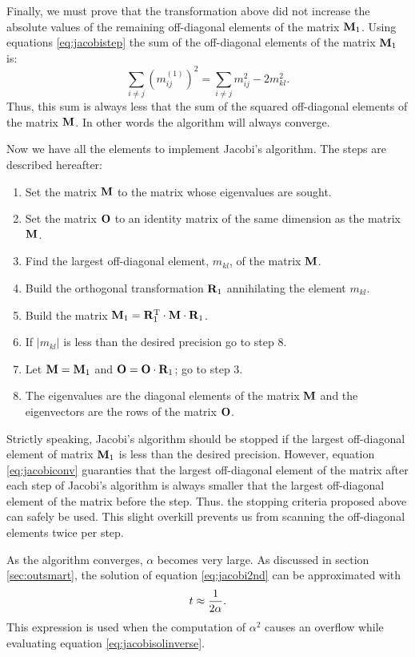 \documentclass[twoside]{book}
\begin{document}
Finally, we must prove that the transformation above did not
increase the absolute values of the remaining off-diagonal
elements of the matrix ${\bf M}_1$. Using equations
\ref{eq:jacobistep} the sum of the off-diagonal elements of the
matrix ${\bf M}_1$ is:
\begin{equation}
\label{eq:jacobiconv}
  \sum_{i\ne j}\left(m^{\left(1\right)}_{ij}\right)^2=\sum_{i\ne j}m_{ij}^2-2 m^2_{kl}.
\end{equation}
Thus, this sum is always less that the sum of the squared
off-diagonal elements of the matrix ${\bf M}$. In other words the
algorithm will always converge.

 Now we have all the elements to
implement Jacobi's algorithm. The steps are described hereafter:
\begin{enumerate}
  \item Set the matrix ${\bf M}$ to the matrix whose eigenvalues
  are sought.
  \item Set the matrix ${\bf O}$ to an identity matrix of the same
  dimension as the matrix ${\bf M}$.
  \item Find the largest off-diagonal element, $m_{kl}$, of the matrix ${\bf
  M}$.
  \item Build the orthogonal transformation ${\bf R}_1$
  annihilating the element $m_{kl}$.
  \item Build the matrix ${\bf M}_1={\bf R}^{\mathop{\rm T}}_1\cdot{\bf M}\cdot{\bf
  R}_1$.
  \item If $\left|m_{kl}\right|$ is less than the desired
  precision go to step 8.
  \item Let ${\bf M}={\bf M}_1$ and ${\bf O}={\bf O}\cdot{\bf R}_1$; go to step 3.
  \item The eigenvalues are the diagonal elements of the matrix ${\bf
  M}$ and the eigenvectors are the rows of the matrix ${\bf O}$.
\end{enumerate}
Strictly speaking, Jacobi's algorithm should be stopped if the
largest off-diagonal element of matrix ${\bf M}_1$ is less than
the desired precision. However, equation \ref{eq:jacobiconv}
guaranties that the largest off-diagonal element of the matrix
after each step of Jacobi's algorithm is always smaller that the
largest off-diagonal element of the matrix before the step. Thus.
the stopping criteria proposed above can safely be used. This
slight overkill prevents us from scanning the off-diagonal
elements twice per step.

As the algorithm converges, $\alpha$ becomes very large. As
discussed in section \ref{sec:outsmart}, the solution of equation
\ref{eq:jacobi2nd} can be approximated with
\begin{equation}
  t\approx{\displaystyle 1\over\displaystyle 2\alpha}.
\end{equation}
This expression is used when the computation of $\alpha^2$ causes
an overflow while evaluating equation \ref{eq:jacobisolinverse}.
\end{document}
